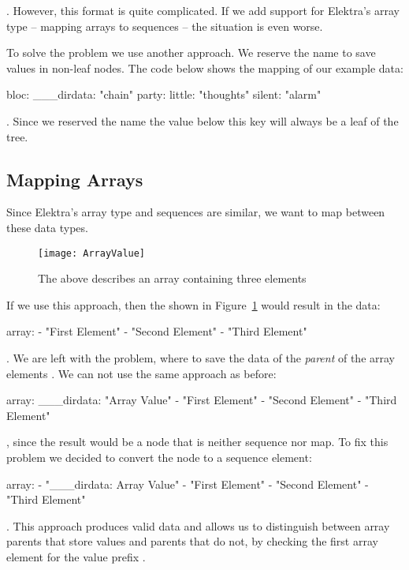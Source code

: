 . However, this format is quite complicated. If we add support for Elektra’s array type – mapping arrays to  sequences – the situation is even worse.

To solve the problem we use another approach. We reserve the name  to save values in non-leaf nodes. The code below shows the mapping of our example data:

\begin{yamlcode}
  bloc:
    ___dirdata: "chain"
    party:
      little: "thoughts"
      silent: "alarm"
\end{yamlcode}

. Since we reserved the name  the value below this key will always be a leaf of the tree.

\subsection{Mapping Arrays}

Since Elektra’s array type and  sequences are similar, we want to map between these data types.

\begin{figure}
  \centering
    \texttt{[image: ArrayValue]}
  \caption{The  above describes an array containing three elements}
  \label{fig:array_value}
\end{figure}

If we use this approach, then the  shown in Figure~\ref{fig:array_value} would result in the  data:

\begin{yamlcode}
  array:
    - "First Element"
    - "Second Element"
    - "Third Element"
\end{yamlcode}

. We are left with the problem, where to save the data of the \emph{parent}  of the array elements . We can not use the same approach as before:

\begin{yamlcode}
  array:
    ___dirdata: "Array Value"
    - "First Element"
    - "Second Element"
    - "Third Element"
\end{yamlcode}

, since the result would be a  node that is neither sequence nor map. To fix this problem we decided to convert the  node to a sequence element:

\begin{yamlcode}
  array:
    - "___dirdata: Array Value"
    - "First Element"
    - "Second Element"
    - "Third Element"
\end{yamlcode}

. This approach produces valid  data and allows us to distinguish between array parents that store values and parents that do not, by checking the first array element for the value prefix .
